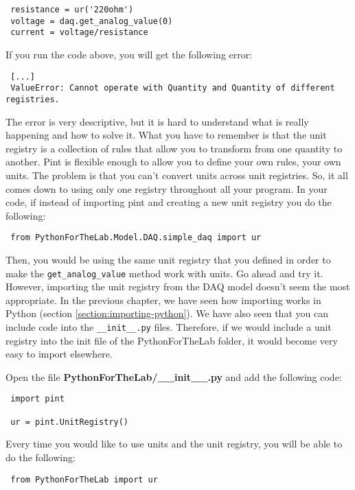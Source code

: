 \begin{verbatim}
 resistance = ur('220ohm')
 voltage = daq.get_analog_value(0)
 current = voltage/resistance
\end{verbatim}

If you run the code above, you will get the following error:

\begin{verbatim}
 [...]
 ValueError: Cannot operate with Quantity and Quantity of different registries.
\end{verbatim}

The error is very descriptive, but it is hard to understand what is really happening and how to solve it. What you have to remember is that the unit registry is a collection of rules that allow you to transform from one quantity to another. Pint is flexible enough to allow you to define your own rules, your own units. The problem is that you can't convert units across unit registries. So, it all comes down to using only one registry throughout all your program. In your code, if instead of importing pint and creating a new unit registry you do the following:

\begin{verbatim}
 from PythonForTheLab.Model.DAQ.simple_daq import ur
\end{verbatim}

Then, you would be using the same unit registry that you defined in order to make the \texttt{get\_analog\_value} method work with units. Go ahead and try it. However, importing the unit registry from the DAQ model doesn't seem the most appropriate. In the previous chapter, we have seen how importing works in Python (section \ref{section:importing-python}). We have also seen that you can include code into the \texttt{\_\_init\_\_.py} files. Therefore, if we would include a unit registry into the init file of the PythonForTheLab folder, it would become very easy to import elsewhere. 

Open the file \textbf{PythonForTheLab/\_\_init\_\_.py} and add the following code:

\begin{verbatim}
 import pint
 
 ur = pint.UnitRegistry()
\end{verbatim}

Every time you would like to use units and the unit registry, you will be able to do the following:

\begin{verbatim}
 from PythonForTheLab import ur
\end{verbatim}

